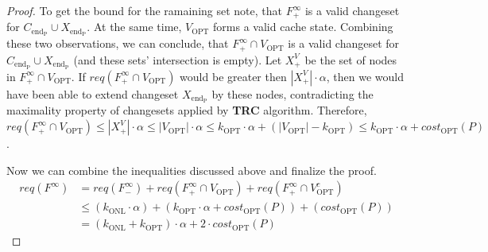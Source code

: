 \begin{proof}
To get the bound for the ramaining set note, that $F^{\infty}_{+}$ is a valid 
changeset for $C_{\mathrm{end_P}} \cup X_{\mathrm{end_P}}$. At the same time, 
$V_{\mathrm{OPT}}$ forms a valid cache state. Combining these two observations, 
we can conclude, that 
$F^{\infty}_{+} \cap V_{\mathrm{OPT}}$ is a valid changeset for 
$C_{\mathrm{end_P}} \cup X_{\mathrm{end_P}}$ (and these sets' intersection is 
empty). Let $X^{V}_{+}$ be the set of nodes in $F^{\infty}_{+} \cap V_{\mathrm{OPT}}$. If 
$req(F^{\infty}_{+} \cap V_{\mathrm{OPT}})$ would be greater then $|X^{V}_{+}| 
\cdot \alpha$, then we would have been able to extend changeset 
$X_{\mathrm{end_P}}$ by these nodes, 
contradicting the maximality property of changesets applied by \textbf{TRC} algorithm. 
Therefore, $req(F^{\infty}_{+} \cap V_{\mathrm{OPT}}) \leq |X^{V}_{+}| \cdot 
\alpha \leq |V_{\mathrm{OPT}}| \cdot \alpha \leq k_{\mathrm{OPT}} \cdot \alpha 
+ (|V_{\mathrm{OPT}}| - k_{\mathrm{OPT}}) \leq k_{\mathrm{OPT}} \cdot \alpha 
+ cost_{\mathrm{OPT}}(P)$.

Now we can combine the inequalities discussed above and finalize the proof.
\begin{equation*}
\begin{split}
req(F^{\infty}) & = req(F^{\infty}_{-}) + 
req(F^{\infty}_{+} \cap V_{\mathrm{OPT}}) + req(F^{\infty}_{+} \cap 
V_{\mathrm{OPT}}^c) \\
& \leq (k_{\mathrm{ONL}} \cdot \alpha) + (k_{\mathrm{OPT}} \cdot \alpha 
+ cost_{\mathrm{OPT}}(P)) + (cost_{\mathrm{OPT}}(P)) \\ 
& = (k_{\mathrm{ONL}} + 
k_{\mathrm{OPT}}) \cdot \alpha + 2 \cdot 
cost_{\mathrm{OPT}}(P)
\end{split}
\end{equation*}
\end{proof}

